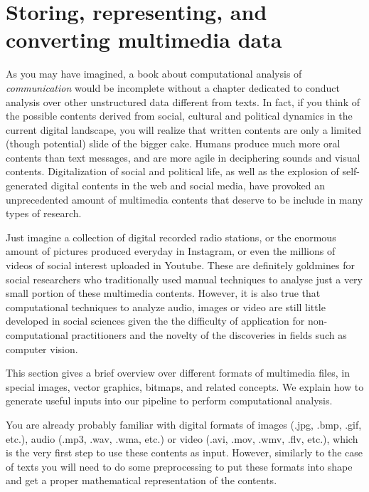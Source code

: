 \section{Storing, representing, and converting multimedia data}
\label{sec:storing}

As you may have imagined, a book about computational analysis of \textit{communication} would be incomplete without a chapter dedicated to conduct analysis over other unstructured data different from texts. In fact, if you think of the possible contents derived from social, cultural and political dynamics in the current digital landscape, you will realize that written contents are only a limited (though potential) slide of the bigger cake. Humans produce much more oral contents than text messages, and are more agile in deciphering sounds and visual contents. Digitalization of social and political life, as well as the explosion of self-generated digital contents in the web and social media, have provoked an unprecedented amount of multimedia contents that deserve to be include in many types of research.

Just imagine a collection of digital recorded radio stations, or the enormous amount of pictures produced everyday in Instagram, or even the millions of videos of social interest uploaded in Youtube. These are definitely goldmines for social researchers who traditionally used manual techniques to analyse just a very small portion of these multimedia contents. However, it is also true that computational techniques to analyze audio, images or video are still little developed in social sciences given the the difficulty of application for non-computational practitioners and the novelty of the discoveries in fields such as computer vision. 

This section gives a brief overview over different formats of multimedia files, in special images, vector graphics, bitmaps, and related concepts. We explain how to generate useful inputs into our pipeline to perform computational analysis.

You are already probably familiar with digital formats of images (.jpg, .bmp, .gif, etc.), audio (.mp3, .wav, .wma, etc.) or video (.avi, .mov, .wmv, .flv, etc.), which is the very first step to use these contents as input. However, similarly to the case of texts you will need to do some preprocessing to put these formats into shape and get a proper mathematical representation of the contents. 

